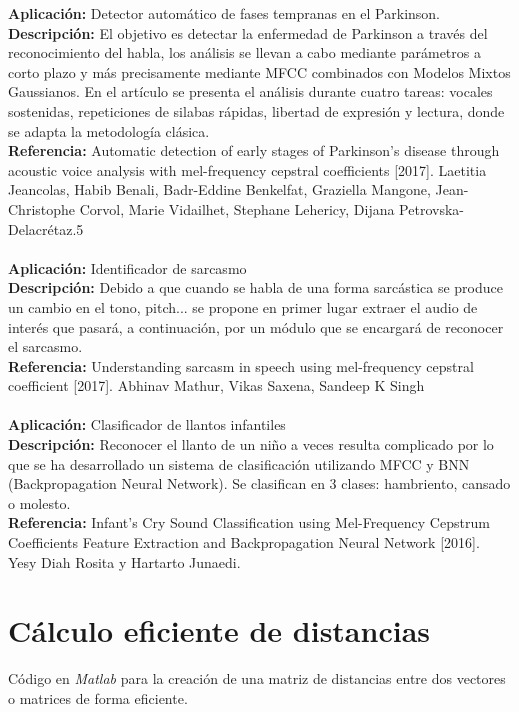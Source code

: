 \documentclass[12pt]{article}
\begin{document}
\textbf{Aplicación:} Detector automático de fases tempranas en el Parkinson.\\
\textbf{Descripción:} El objetivo es detectar la enfermedad de Parkinson a través del reconocimiento del habla, los análisis se llevan a cabo mediante parámetros a corto plazo y más precisamente mediante MFCC combinados con Modelos Mixtos Gaussianos. 
En el artículo se presenta el análisis durante cuatro tareas: vocales sostenidas, repeticiones de silabas rápidas, libertad de expresión y lectura, donde se adapta la metodología clásica.\\
\textbf{Referencia:} Automatic detection of early stages of Parkinson's disease through acoustic voice analysis with mel-frequency cepstral coefficients [2017]. Laetitia Jeancolas, Habib Benali, Badr-Eddine Benkelfat, Graziella Mangone, Jean-Christophe Corvol, Marie Vidailhet, Stephane Lehericy, Dijana Petrovska-Delacrétaz.5\\\\

\textbf{Aplicación:} Identificador de sarcasmo\\
\textbf{Descripción:} Debido a que cuando se habla de una forma sarcástica se produce un cambio en el tono, pitch... se propone en primer lugar extraer el audio de interés que pasará, a continuación, por un módulo que se encargará de reconocer el sarcasmo.\\
\textbf{Referencia:} Understanding sarcasm in speech using mel-frequency cepstral coefficient [2017]. Abhinav Mathur, Vikas Saxena, Sandeep K Singh\\\\

\textbf{Aplicación:} Clasificador de llantos infantiles\\
\textbf{Descripción:}  Reconocer el llanto de un niño a veces resulta complicado por lo que se ha desarrollado un sistema de clasificación utilizando MFCC y BNN (Backpropagation Neural Network). Se clasifican en 3 clases: hambriento, cansado o molesto.\\
\textbf{Referencia:} Infant’s Cry Sound Classification using Mel-Frequency Cepstrum Coefficients Feature Extraction and Backpropagation Neural Network [2016]. Yesy Diah Rosita y Hartarto Junaedi.\\


\section{Cálculo eficiente de distancias}
Código en \textit{Matlab} para la creación de una matriz de distancias entre dos vectores o matrices de forma eficiente.\\



\end{document}
